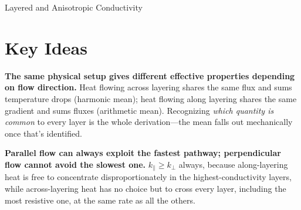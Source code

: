 \begin{activity}{Layered and Anisotropic Conductivity}
\section*{Key Ideas}

\textbf{The same physical setup gives different effective properties depending on flow direction.} Heat flowing across layering shares the same flux and sums temperature drops (harmonic mean); heat flowing along layering shares the same gradient and sums fluxes (arithmetic mean). Recognizing \emph{which quantity is common} to every layer is the whole derivation---the mean falls out mechanically once that's identified.

\textbf{Parallel flow can always exploit the fastest pathway; perpendicular flow cannot avoid the slowest one.} $k_\parallel \ge k_\perp$ always, because along-layering heat is free to concentrate disproportionately in the highest-conductivity layers, while across-layering heat has no choice but to cross every layer, including the most resistive one, at the same rate as all the others.


\newcommand{\slow}[2]{
    \draw[fill,orange] (#1,#2) circle (0.5) node[white,font=\bfseries] {\scriptsize SLOW};
    \draw[thick,white] (#1,#2) circle (0.45);
}
\newcommand{\fast}[2]{
    \draw[fill,grass] (#1,#2) circle (0.5) node[white, font=\bfseries] {\scriptsize GO};
    \draw[thick,white] (#1,#2) circle (0.45);
}

\begin{center}
\end{center}
\end{activity}
